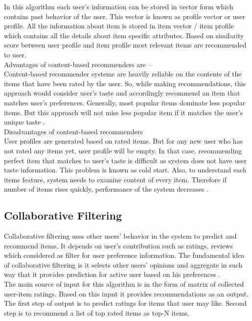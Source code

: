 \noindent In this algorithm each user's information can be stored in vector form which contains past behavior of the user. This vector is known as profile vector or user profile. All the information about item is stored in item vector / item profile which contains all the details about item specific attributes. Based on similarity score between user profile and item profile most relevant items are recommended to user. 
\\
Advantages of content-based recommenders are – 
\\
Content-based recommender systems are heavily reliable on the contents of the items that have been rated by the user. So, while making recommendations, this approach would consider user’s taste and accordingly recommend an item that matches user’s preferences. Generally, most popular items dominate less popular items. But this approach will not miss less popular item if it matches the user’s unique taste \cite{contentbased}.
\\
Disadvantages of content-based recommenders
\\
User profiles are generated based on rated items. But for any new user who has not rated any items yet, user profile will be empty. In that case, recommending perfect item that matches to user’s taste is difficult as system does not have user taste information. This problem is known as cold start. Also, to understand each items feature, system needs to examine content of every item. Therefore if number of items rises quickly, performance of the system decreases \cite{contentbased}.  
\\

\subsection{Collaborative Filtering}
Collaborative filtering uses other users’ behavior in the system to predict and recommend items. It depends on user’s contribution such as ratings, reviews which considered as filter for user preference information. The fundamental idea of collaborative filtering is it selects other users’ opinions and aggregate in such way that it provides prediction for active user based on his preferences \cite{CF}. 
\\The main source of input for this algorithm is in the form of matrix of collected user-item ratings. Based on this input it provides recommendations as an output. The first step of output is to predict ratings for items that user may like. Second step is to recommend a list of top rated items as top-N items.
\\

